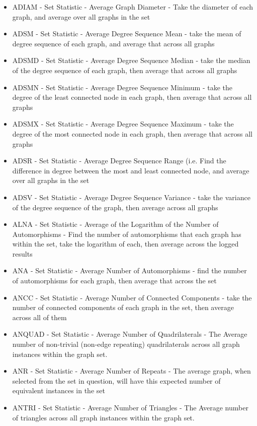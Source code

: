 \begin{itemize}

\item{ADIAM - Set Statistic - Average Graph Diameter - Take the diameter of each graph, and average over all graphs in the set}
\item{ADSM - Set Statistic - Average Degree Sequence Mean - take the mean of degree sequence of each graph, and average that across all graphs}
\item{ADSMD - Set Statistic - Average Degree Sequence Median - take the median of the degree sequence of each graph, then average that across all graphs}
\item{ADSMN - Set Statistic - Average Degree Sequence Minimum - take the degree of the least connected node in each graph, then average that across all graphs}
\item{ADSMX - Set Statistic - Average Degree Sequence Maximum - take the degree of the most connected node in each graph, then average that across all graphs}
\item{ADSR - Set Statistic - Average Degree Sequence Range  (i.e. Find the difference in degree between the most and least connected node, and average over all graphs in the set}
\item{ADSV - Set Statistic - Average Degree Sequence Variance - take the variance of the degree sequence of the graph, then average across all graphs}
\item{ALNA - Set Statistic - Average of the Logarithm of the Number of Automorphisms - Find the number of automorphisms that each graph has within the set, take the logarithm of each, then average across the logged results}
\item{ANA - Set Statistic - Average Number of Automorphisms - find the number of automorphisms for each graph, then average that across the set}
\item{ANCC - Set Statistic - Average Number of Connected Components - take the number of connected components of each graph in the set, then average across all of them}
\item{ANQUAD - Set Statistic - Average Number of Quadrilaterals - The Average number of non-trivial (non-edge repeating) quadrilaterals across all graph instances within the graph set.}
\item{ANR - Set Statistic - Average Number of Repeats - The average graph, when selected from the set in question, will have this expected number of equivalent instances in the set}
\item{ANTRI - Set Statistic - Average Number of Triangles - The Average number of triangles across all graph instances within the graph set.}

\end{itemize}
